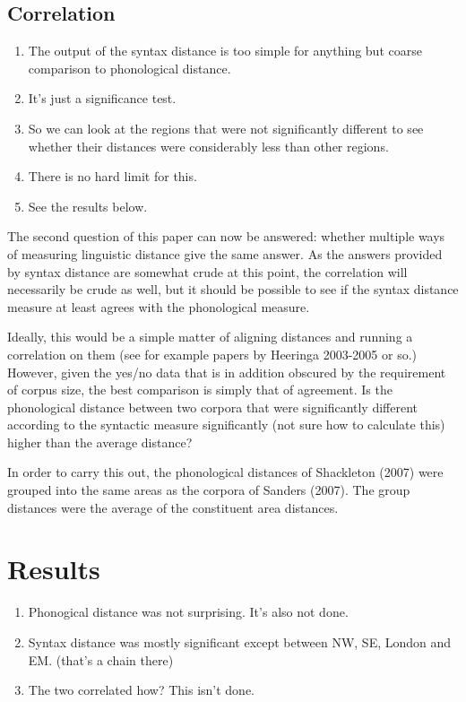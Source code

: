\documentclass[11pt]{article}
\begin{document}
\subsection{Correlation}
\begin{enumerate}
\item The output of the syntax distance is too simple for anything but
  coarse comparison to phonological distance.
\item It's just a significance test.
\item So we can look at the regions that were not significantly
  different to see whether their distances were considerably less than
  other regions.
\item There is no hard limit for this.
\item See the results below.
\end{enumerate}
The second question of this paper can now be answered: whether
multiple ways of measuring linguistic distance give the same
answer. As the answers provided by syntax distance are somewhat crude
at this point, the correlation will necessarily be crude as well, but
it should be possible to see if the syntax distance measure at least
agrees with the phonological measure.

Ideally, this would be a simple matter of aligning distances and
running a correlation on them (see for example papers by Heeringa
2003-2005 or so.) However, given the yes/no data that is in addition
obscured by the requirement of corpus size, the best comparison is
simply that of agreement. Is the phonological distance between two corpora that
were significantly different according to the syntactic measure
significantly (not sure how to calculate this) higher than the average
distance?

In order to carry this out, the phonological distances of Shackleton
(2007) were grouped into the same areas as the corpora of Sanders
(2007). The group distances were the average of the constituent area distances.
\section{Results}
\begin{enumerate}
\item Phonogical distance was not surprising. It's also not done.
\item Syntax distance was mostly significant except between NW, SE,
  London and EM. (that's a chain there)
\item The two correlated how? This isn't done.
\end{enumerate}
\end{document}

